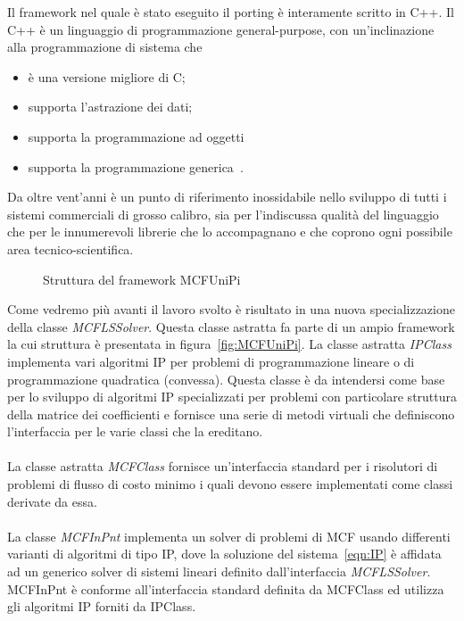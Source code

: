 \label{cap:Framework}

Il framework nel quale è stato eseguito il porting è interamente scritto in C++.
Il C++ è un linguaggio di programmazione general-purpose, con un'inclinazione alla programmazione di sistema che
\begin{itemize}
\item è una versione migliore di C;
\item supporta l'astrazione dei dati;
\item supporta la programmazione ad oggetti
\item supporta la programmazione generica~\cite{Bjarne}.
\end{itemize}

Da oltre vent'anni è un punto di riferimento inossidabile nello sviluppo di tutti i sistemi commerciali di grosso calibro, sia per l'indiscussa qualità del linguaggio che per le innumerevoli librerie che lo accompagnano e che coprono ogni possibile area tecnico-scientifica.


\begin{figure}%
\centering
{}%
\caption{Struttura del framework MCFUniPi}%
\label{fig:MCFUniPi}%
\end{figure}%

Come vedremo più avanti il lavoro svolto è risultato in una nuova specializzazione della classe \emph{MCFLSSolver}.
Questa classe astratta fa parte di un ampio framework la cui struttura è presentata in figura~\vref{fig:MCFUniPi}.
La classe astratta \emph{IPClass} implementa vari algoritmi IP per problemi di programmazione lineare o di programmazione quadratica (convessa).
Questa classe è da intendersi come base per lo sviluppo di algoritmi IP specializzati per problemi con particolare struttura della matrice dei coefficienti e fornisce una serie di metodi virtuali che definiscono l'interfaccia per le varie classi che la ereditano.\\
\\
La classe astratta \emph{MCFClass} fornisce un'interfaccia standard per i risolutori di problemi di flusso di costo minimo i quali devono essere implementati come classi derivate da essa.\\
\\
La classe \emph{MCFInPnt} implementa un solver di problemi di MCF usando differenti varianti di algoritmi di tipo IP, dove la soluzione del sistema~\eqref{eqn:IP} è affidata ad un generico solver di sistemi lineari definito dall'interfaccia \emph{MCFLSSolver}. MCFInPnt è conforme all'interfaccia standard definita da MCFClass ed utilizza gli algoritmi IP forniti da IPClass.

